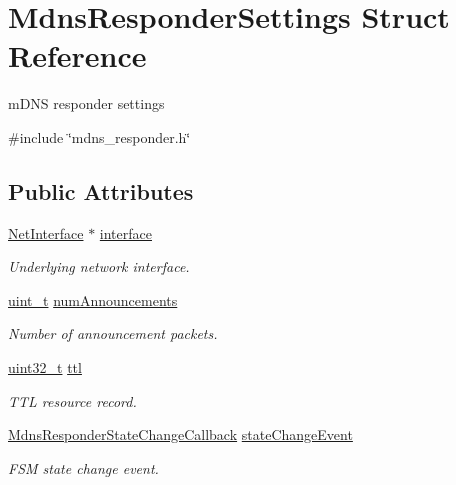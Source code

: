 \hypertarget{structMdnsResponderSettings}{}\section{Mdns\+Responder\+Settings Struct Reference}
\label{structMdnsResponderSettings}


m\+D\+NS responder settings  




{\ttfamily \#include \char`\"{}mdns\+\_\+responder.\+h\char`\"{}}

\subsection*{Public Attributes}
\begin{DoxyCompactItemize}
\item 
\hyperlink{net_8h_a2234db8911a1148c9159979d8f5e0d6b}{Net\+Interface} $\ast$ \hyperlink{structMdnsResponderSettings_a41dce50accdf1d8b755c283ac0e643d4}{interface}
\begin{DoxyCompactList}\small\item\em Underlying network interface. \end{DoxyCompactList}\item 
\hyperlink{compiler__port_8h_a12a1e9b3ce141648783a82445d02b58d}{uint\+\_\+t} \hyperlink{structMdnsResponderSettings_a282b3d4be3aed23875ffe59061294fc3}{num\+Announcements}
\begin{DoxyCompactList}\small\item\em Number of announcement packets. \end{DoxyCompactList}\item 
\hyperlink{stdint_8h_a435d1572bf3f880d55459d9805097f62}{uint32\+\_\+t} \hyperlink{structMdnsResponderSettings_a41f33d42f7fe7bd59d99628b64f4f81a}{ttl}
\begin{DoxyCompactList}\small\item\em T\+TL resource record. \end{DoxyCompactList}\item 
\hyperlink{mdns__responder_8h_a1f5892c829ec9bb9fc3442afdc64a92e}{Mdns\+Responder\+State\+Change\+Callback} \hyperlink{structMdnsResponderSettings_a37f9ce82f094fb92d3c7372c02b03bb7}{state\+Change\+Event}
\begin{DoxyCompactList}\small\item\em F\+SM state change event. \end{DoxyCompactList}\end{DoxyCompactItemize}


